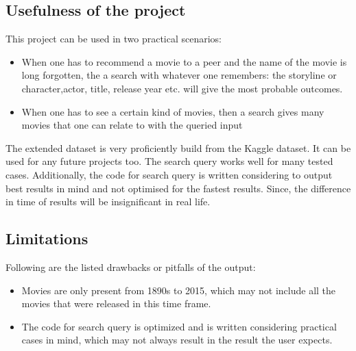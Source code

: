 \documentclass{article}
\begin{document}
\subsection{Usefulness of the project}
This project can be used in two practical scenarios:
\begin{itemize}
    \item When one has to recommend a movie to a peer and the name of the movie is long forgotten, the a search with whatever one remembers: the storyline or character,actor, title, release year etc. will give the most probable outcomes.
    \item When one has to see a certain kind of movies, then a search gives many movies that one can relate to with the queried input
\end{itemize}
The extended dataset is very proficiently build from the Kaggle dataset. It can be used for any future projects too. The search query works well for many tested cases. Additionally, the code for search query is written considering to output best results in mind and not optimised for the fastest results. Since, the difference in time of results will be insignificant in real life.    
\subsection{Limitations}
Following are the listed drawbacks or pitfalls of the output:
\begin{itemize}
    \item Movies are only present from 1890s to 2015, which may not include all the movies that were released in this time frame.
    \item The code for search query is optimized and is written considering practical cases in mind, which may not always result in the result the user expects.
\end{itemize}
\end{document}

